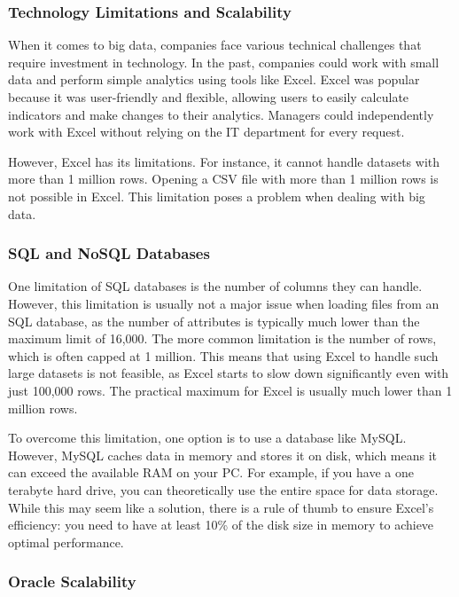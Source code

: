 \subsubsection{Technology Limitations and Scalability}

When it comes to big data, companies face various technical challenges
that require investment in technology. In the past, companies could work
with small data and perform simple analytics using tools like Excel.
Excel was popular because it was user-friendly and flexible, allowing
users to easily calculate indicators and make changes to their
analytics. Managers could independently work with Excel without relying
on the IT department for every request.

However, Excel has its limitations. For instance, it cannot handle
datasets with more than 1 million rows. Opening a CSV file with more
than 1 million rows is not possible in Excel. This limitation poses a
problem when dealing with big data.

\subsubsection{SQL and NoSQL Databases}

One limitation of SQL databases is the number of columns they can
handle. However, this limitation is usually not a major issue when
loading files from an SQL database, as the number of attributes is
typically much lower than the maximum limit of 16,000. The more common
limitation is the number of rows, which is often capped at 1 million.
This means that using Excel to handle such large datasets is not
feasible, as Excel starts to slow down significantly even with just
100,000 rows. The practical maximum for Excel is usually much lower than
1 million rows.

To overcome this limitation, one option is to use a database like MySQL.
However, MySQL caches data in memory and stores it on disk, which means
it can exceed the available RAM on your PC. For example, if you have a
one terabyte hard drive, you can theoretically use the entire space for
data storage. While this may seem like a solution, there is a rule of
thumb to ensure Excel's efficiency: you need to have at least 10\% of
the disk size in memory to achieve optimal performance.

\subsubsection{Oracle Scalability}

